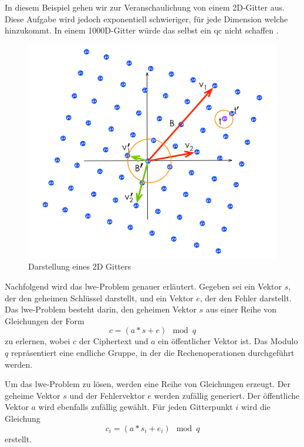 In diesem Beispiel gehen wir zur Veranschaulichung von einem 2D-Gitter aus. Diese Aufgabe wird jedoch exponentiell schwieriger, für jede Dimension welche hinzukommt. In einem 1000D-Gitter würde das selbst ein \ac{qc} nicht schaffen \cite[Abs. 3]{xu_lighting_2018}.

\begin{figure}[h]
    \begin{center}
        \includegraphics[width=\columnwidth]{./images/lattice.PNG}
    \end{center}
    \caption{
        Darstellung eines 2D Gitters \\ 
        \cite[Fig. 2]{xu_lighting_2018}
    }
    \label{fig:Darstellung eines 2D Gitters}
\end{figure}

Nachfolgend wird das \ac{lwe}-Problem genauer erläutert. Gegeben sei ein Vektor $s$, der den geheimen Schlüssel darstellt, und ein Vektor $e$, der den Fehler darstellt. 
Das \ac{lwe}-Problem besteht darin, den geheimen Vektor $s$ aus einer Reihe von Gleichungen der Form 
$$c = (a * s + e)\mod{q}$$ zu erlernen, wobei $c$ der Ciphertext und $a$ ein öffentlicher Vektor ist. 
Das Modulo $q$ repräsentiert eine endliche Gruppe, in der die Rechenoperationen durchgeführt werden.

Um das \ac{lwe}-Problem zu lösen, werden eine Reihe von Gleichungen erzeugt. Der geheime Vektor $s$ und der Fehlervektor $e$ werden zufällig generiert. Der öffentliche Vektor $a$ wird ebenfalls zufällig gewählt. Für jeden Gitterpunkt $i$ wird die Gleichung 
$$c_i = (a * s_i + e_i) \mod{q}$$ 
erstellt.

